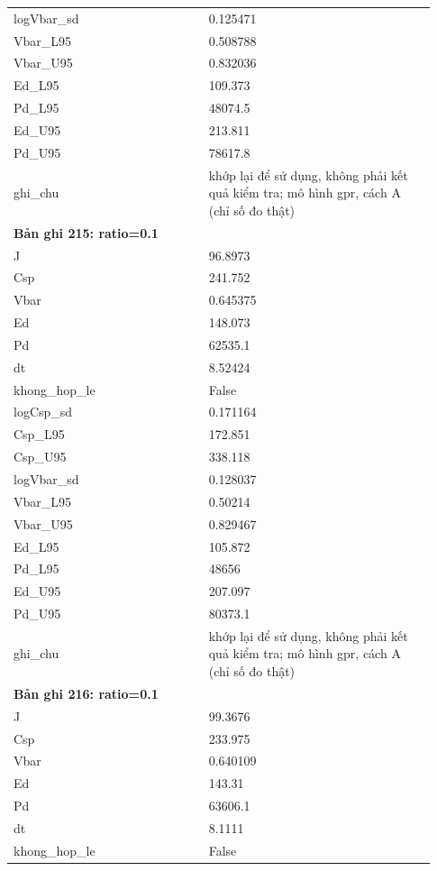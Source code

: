 \begin{longtable}{p{0.43\linewidth}p{0.50\linewidth}}
logVbar\_\allowbreak sd & 0.125471 \\
Vbar\_\allowbreak L95 & 0.508788 \\
Vbar\_\allowbreak U95 & 0.832036 \\
Ed\_\allowbreak L95 & 109.373 \\
Pd\_\allowbreak L95 & 48074.5 \\
Ed\_\allowbreak U95 & 213.811 \\
Pd\_\allowbreak U95 & 78617.8 \\
ghi\_\allowbreak chu & khớp lại để sử dụng, không phải kết quả kiểm tra; mô hình gpr, cách A (chỉ số đo thật) \\
\midrule
\multicolumn{2}{p{0.95\linewidth}}{\textbf{Bản ghi 215: ratio=0.1}} \\
J & 96.8973 \\
Csp & 241.752 \\
Vbar & 0.645375 \\
Ed & 148.073 \\
Pd & 62535.1 \\
dt & 8.52424 \\
khong\_\allowbreak hop\_\allowbreak le & False \\
logCsp\_\allowbreak sd & 0.171164 \\
Csp\_\allowbreak L95 & 172.851 \\
Csp\_\allowbreak U95 & 338.118 \\
logVbar\_\allowbreak sd & 0.128037 \\
Vbar\_\allowbreak L95 & 0.50214 \\
Vbar\_\allowbreak U95 & 0.829467 \\
Ed\_\allowbreak L95 & 105.872 \\
Pd\_\allowbreak L95 & 48656 \\
Ed\_\allowbreak U95 & 207.097 \\
Pd\_\allowbreak U95 & 80373.1 \\
ghi\_\allowbreak chu & khớp lại để sử dụng, không phải kết quả kiểm tra; mô hình gpr, cách A (chỉ số đo thật) \\
\midrule
\multicolumn{2}{p{0.95\linewidth}}{\textbf{Bản ghi 216: ratio=0.1}} \\
J & 99.3676 \\
Csp & 233.975 \\
Vbar & 0.640109 \\
Ed & 143.31 \\
Pd & 63606.1 \\
dt & 8.1111 \\
khong\_\allowbreak hop\_\allowbreak le & False \\

\end{longtable}
